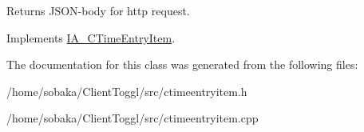 \begin{DoxyReturn}{Returns}
J\+S\+O\+N-\/body for http request. 
\end{DoxyReturn}


Implements \hyperlink{classIA__CTimeEntryItem}{I\+A\+\_\+\+C\+Time\+Entry\+Item}.



The documentation for this class was generated from the following files\+:\begin{DoxyCompactItemize}
\item 
/home/sobaka/\+Client\+Toggl/src/ctimeentryitem.\+h\item 
/home/sobaka/\+Client\+Toggl/src/ctimeentryitem.\+cpp\end{DoxyCompactItemize}
